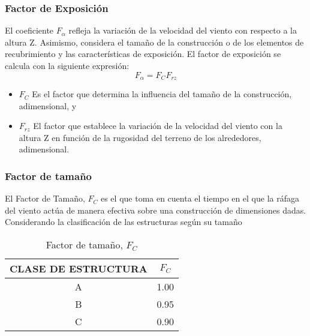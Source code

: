 \subsubsection{Factor de Exposición}
El coeficiente $F_{\alpha}$ refleja la variación de la velocidad del viento con respecto a la altura Z. Asimismo, considera el tamaño de la construcción o de los elementos de recubrimiento y las características de exposición.
El factor de exposición se calcula con la siguiente expresión:
\begin{equation}
    F_{\alpha}= F_C F_{rz}
\end{equation}

\begin{notation}
    \begin{itemize}
        \item $F_C$ Es el factor que determina la influencia del tamaño de la construcción, adimensional, y
    \item $F_{rz}$ El factor que establece la variación de la velocidad del viento con la altura Z en función de la rugosidad del terreno de los alrededores, adimensional. 
    \end{itemize}
\end{notation}

\subsubsection{Factor de tamaño}
El Factor de Tamaño, $F_C$ es el que toma en cuenta el tiempo en el que la ráfaga del viento actúa de manera efectiva sobre una construcción de dimensiones dadas. Considerando la clasificación de las estructuras según su tamaño
\begin{table}[h!]
    \centering
    \begin{tabular}{@{}cc@{}}
    \toprule
    CLASE DE ESTRUCTURA & $F_C$   \\ \midrule
    A                   & 1.00 \\
    B                   & 0.95 \\
    C                   & 0.90 \\ \bottomrule
    \end{tabular}
    \caption{ Factor de tamaño, $F_C$}
    \label{tabemm}
\end{table}
